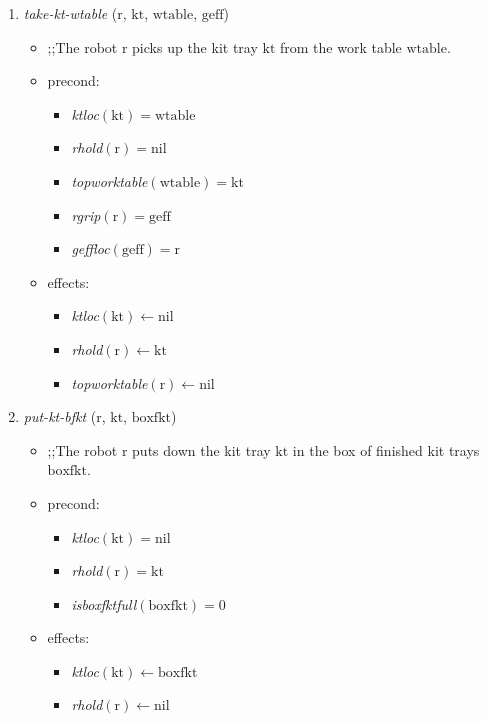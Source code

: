 \begin{small}
\begin{enumerate}
\item \textsl{take-kt-wtable} ($\mathrm{r}$, $\mathrm{kt}$, $\mathrm{wtable}$, $\mathrm{geff}$)
\begin{itemize}
\item ;;The robot $\mathrm{r}$ picks up the kit tray $\mathrm{kt}$ from the work table $\mathrm{wtable}$.
\item precond:
\begin{itemize}
\item[]\emph{ktloc}$\mathrm{(kt)=wtable}$
\item[]\emph{rhold}$\mathrm{(r)=nil}$
\item[]\emph{topworktable}$\mathrm{(wtable)=kt}$
\item[]\emph{rgrip}$\mathrm{(r)=geff}$
\item[]\emph{geffloc}$\mathrm{(geff)=r}$
\end{itemize}
\item effects: 
\begin{itemize}
\item[]\emph{ktloc}$\mathrm{(kt)\leftarrow nil}$
\item[]\emph{rhold}$\mathrm{(r)\leftarrow kt}$
\item[]\emph{topworktable}$\mathrm{(r)\leftarrow nil}$
\end{itemize}
\end{itemize}

\item \textsl{put-kt-bfkt} ($\mathrm{r}$, $\mathrm{kt}$, $\mathrm{boxfkt}$)
\begin{itemize}
\item ;;The robot $\mathrm{r}$ puts down the kit tray $\mathrm{kt}$ in the box of finished kit trays $\mathrm{boxfkt}$.
\item precond:
\begin{itemize}
\item[]\emph{ktloc}$\mathrm{(kt)=nil}$
\item[]\emph{rhold}$\mathrm{(r)=kt}$
\item[]\emph{isboxfktfull}$\mathrm{(boxfkt)=0}$
\end{itemize}
\item effects:
\begin{itemize}
\item[]\emph{ktloc}$\mathrm{(kt)\leftarrow boxfkt}$
\item[]\emph{rhold}$\mathrm{(r)\leftarrow nil}$
\end{itemize}
\end{itemize}


\end{enumerate}
\end{small}
